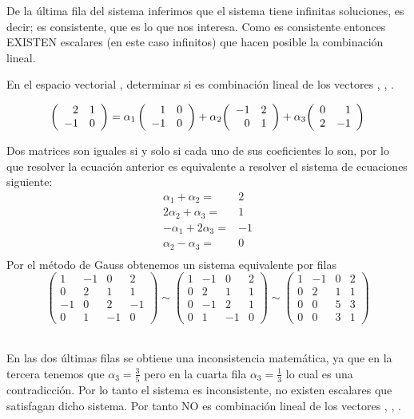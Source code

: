 De la \'ultima fila del sistema inferimos que el sistema tiene infinitas soluciones, es decir; es consistente, que es lo que nos interesa. Como es consistente entonces EXISTEN escalares (en este caso infinitos) que hacen posible la combinaci\'on lineal.

\begin{ejemplo}
En el espacio vectorial \mdosxdos, determinar si 
 es combinaci\'on lineal de los vectores 
, , .
\end{ejemplo}


\[ \left( \begin{array}{rr} 2&1\\ -1&0 \end{array} \right) =
\alpha_1 \left( \begin{array}{rr} 1&0\\ -1&0 \end{array} \right) 
+{\alpha_2}{ \left( \begin{array}{rr} -1&2\\ 0&1 \end{array} \right) }
+{\alpha_3}{ \left( \begin{array}{rr} 0&1\\ 2&-1 \end{array} \right) }
\]

Dos matrices son iguales si y solo si cada uno de sus coeficientes
lo son, por lo que resolver la ecuación anterior es equivalente a resolver el sistema de ecuaciones siguiente:
\begin{align*}
\alpha_1+\alpha_2=&2\\
2\alpha_2+\alpha_3=&1\\
-\alpha_1+2\alpha_3=&-1\\
\alpha_2-\alpha_3=&0\\
\end{align*}
Por el método de Gauss obtenemos un sistema equivalente por filas
\[
\left(
\begin{array}{rrr|r}
1 &-1 &0 &2\\
0&2&1&1\\
-1&0&2&-1\\
0&1&-1&0
\end{array}
\right)
\sim
\left(
\begin{array}{rrr|r}
1 &-1 &0 &2\\
0&2&1&1\\
0&-1&2&1\\
0&1&-1&0
\end{array}
\right)
\sim
\left(
\begin{array}{rrr|r}
1 &-1 &0 &2\\
0&2&1&1\\
0&0&5&3\\
0&0&3&1
\end{array}
\right)\]

~\\
En las dos \'ultimas filas se obtiene una inconsistencia matem\'atica, ya que en la tercera tenemos que 
$\alpha_3=\frac{3}{5}$ 
pero en la cuarta fila 
$\alpha_3=\frac{1}{3}$
lo cual es una contradicci\'on. Por lo tanto el sistema es inconsistente, no existen escalares que satisfagan dicho sistema. Por tanto  NO
 es combinaci\'on lineal de los vectores , , .

